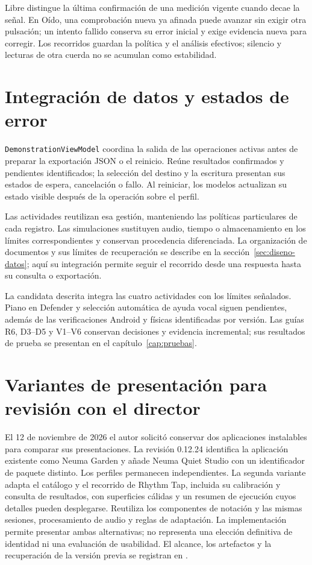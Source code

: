 Libre distingue la última confirmación de una medición vigente cuando decae
la señal. En Oído, una comprobación nueva ya afinada puede avanzar sin exigir
otra pulsación; un intento fallido conserva su error inicial y exige evidencia
nueva para corregir. Los recorridos guardan la política y el análisis efectivos;
silencio y lecturas de otra cuerda no se acumulan como estabilidad.

\section{Integración de datos y estados de error}
\texttt{DemonstrationViewModel} coordina la salida de las operaciones activas
antes de preparar la exportación JSON o el reinicio. Reúne resultados confirmados y
pendientes identificados; la selección del destino y la escritura presentan
sus estados de espera, cancelación o fallo. Al reiniciar, los modelos actualizan
su estado visible después de la operación sobre el perfil.

Las actividades reutilizan esa gestión, manteniendo las políticas particulares
de cada registro. Las simulaciones sustituyen audio, tiempo o almacenamiento
en los límites correspondientes y conservan procedencia diferenciada. La
organización de documentos y sus límites de recuperación se describe en la
sección~\ref{sec:diseno-datos}; aquí su integración permite seguir el recorrido
desde una respuesta hasta su consulta o exportación.

La candidata descrita integra las cuatro actividades con los límites señalados.
Piano en Defender y selección automática de ayuda vocal siguen pendientes,
además de las verificaciones Android y físicas identificadas por versión.
Las guías R6, D3--D5 y V1--V6 conservan decisiones y evidencia incremental;
sus resultados de prueba se presentan en el capítulo~\ref{cap:pruebas}.

\section{Variantes de presentación para revisión con el director}
El 12 de noviembre de 2026 el autor solicitó conservar dos aplicaciones
instalables para comparar sus presentaciones. La revisión 0.12.24 identifica
la aplicación existente como Neuma Garden y añade Neuma Quiet Studio con
un identificador de paquete distinto. Los perfiles permanecen independientes.
La segunda variante adapta el catálogo y el recorrido de Rhythm Tap, incluida
su calibración y consulta de resultados, con superficies cálidas y un resumen
de ejecución cuyos detalles pueden desplegarse. Reutiliza los componentes de
notación y las mismas sesiones, procesamiento de audio y reglas de adaptación.
La implementación permite presentar ambas alternativas; no representa una
elección definitiva de identidad ni una evaluación de usabilidad. El alcance,
los artefactos y la recuperación de la versión previa se registran en
.

